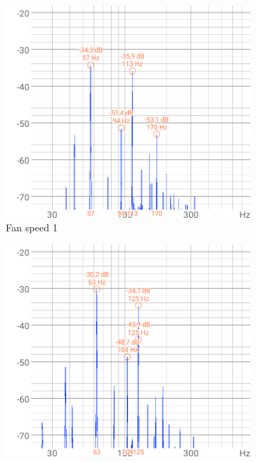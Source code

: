 \begin{figure}[h]
    \centering
    \begin{subfigure}[b]{0.3\textwidth}
        \includegraphics[width=\textwidth]{assets/results/standing-fan/fan-audio-speed-1.png}
        \caption{Fan speed 1}
    \end{subfigure}
    \hfill
    \begin{subfigure}[b]{0.3\textwidth}
        \includegraphics[width=\textwidth]{assets/results/standing-fan/fan-audio-speed-2.png}

\end{subfigure}
\end{figure}
